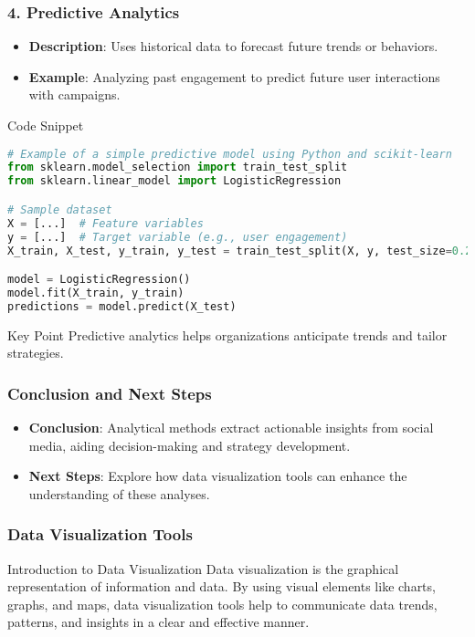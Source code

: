 \documentclass{beamer}
\begin{document}
\begin{frame}[fragile]
    \frametitle{4. Predictive Analytics}
    
    \begin{itemize}
        \item \textbf{Description}: Uses historical data to forecast future trends or behaviors.
        \item \textbf{Example}: Analyzing past engagement to predict future user interactions with campaigns.
    \end{itemize}

    \begin{block}{Code Snippet}
    \begin{lstlisting}[language=Python]
# Example of a simple predictive model using Python and scikit-learn
from sklearn.model_selection import train_test_split
from sklearn.linear_model import LogisticRegression

# Sample dataset
X = [...]  # Feature variables
y = [...]  # Target variable (e.g., user engagement)
X_train, X_test, y_train, y_test = train_test_split(X, y, test_size=0.2, random_state=42)

model = LogisticRegression()
model.fit(X_train, y_train)
predictions = model.predict(X_test)
    \end{lstlisting}
    \end{block}
    
    \begin{block}{Key Point}
        Predictive analytics helps organizations anticipate trends and tailor strategies.
    \end{block}
\end{frame}

\begin{frame}[fragile]
    \frametitle{Conclusion and Next Steps}
    
    \begin{itemize}
        \item \textbf{Conclusion}: Analytical methods extract actionable insights from social media, aiding decision-making and strategy development.
        \item \textbf{Next Steps}: Explore how data visualization tools can enhance the understanding of these analyses.
    \end{itemize}
\end{frame}

\begin{frame}[fragile]
    \frametitle{Data Visualization Tools}
    \begin{block}{Introduction to Data Visualization}
    Data visualization is the graphical representation of information and data. By using visual elements like charts, graphs, and maps, data visualization tools help to communicate data trends, patterns, and insights in a clear and effective manner.
    \end{block}
\end{frame}
\end{document}

